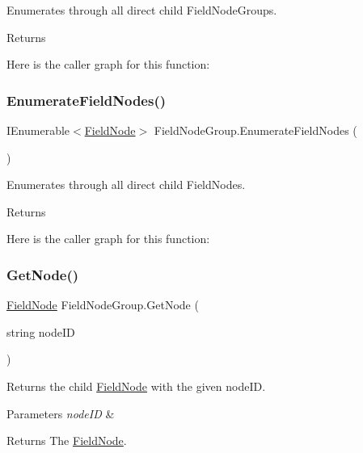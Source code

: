 Enumerates through all direct child Field\+Node\+Groups. 

\begin{DoxyReturn}{Returns}

\end{DoxyReturn}
Here is the caller graph for this function\+:
\mbox{\label{class_field_node_group_a6ac9b5738d3f1931c01f2bd5bc4be5b5}} 
\subsubsection{\texorpdfstring{Enumerate\+Field\+Nodes()}{EnumerateFieldNodes()}}
{\footnotesize\ttfamily I\+Enumerable$<$\hyperlink{class_field_node}{Field\+Node}$>$ Field\+Node\+Group.\+Enumerate\+Field\+Nodes (\begin{DoxyParamCaption}{ }\end{DoxyParamCaption})}



Enumerates through all direct child Field\+Nodes. 

\begin{DoxyReturn}{Returns}

\end{DoxyReturn}
Here is the caller graph for this function\+:
\mbox{\label{class_field_node_group_a9eb2f827c87d034f403cbde900e2e1c7}} 
\subsubsection{\texorpdfstring{Get\+Node()}{GetNode()}}
{\footnotesize\ttfamily \hyperlink{class_field_node}{Field\+Node} Field\+Node\+Group.\+Get\+Node (\begin{DoxyParamCaption}\item[{string}]{node\+ID }\end{DoxyParamCaption})}



Returns the child \hyperlink{class_field_node}{Field\+Node} with the given node\+ID. 


\begin{DoxyParams}{Parameters}
{\em node\+ID} & \\
\hline
\end{DoxyParams}
\begin{DoxyReturn}{Returns}
The \hyperlink{class_field_node}{Field\+Node}.
\end{DoxyReturn}
\mbox{\label{class_field_node_group_abe599247a37372fc997ad8bddb6dd6e1}} 
